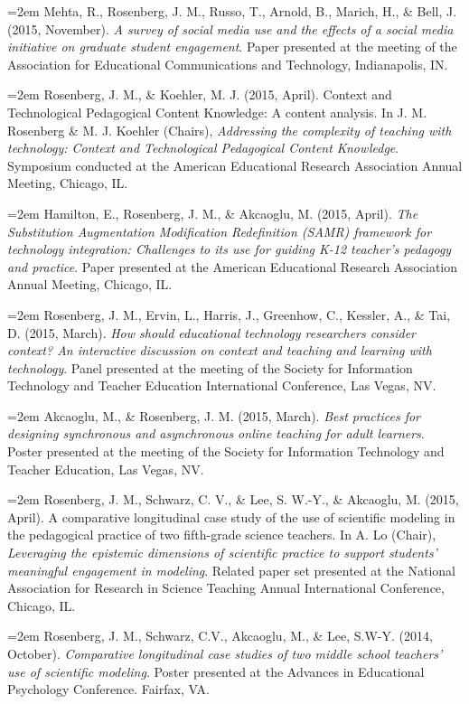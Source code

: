 \documentclass[
  14,
]{article}
\begin{document}
\hangindent=2em Mehta, R., Rosenberg, J. M., Russo, T., Arnold, B.,
Marich, H., \& Bell, J. (2015, November). \emph{A survey of social media
use and the effects of a social media initiative on graduate student
engagement}. Paper presented at the meeting of the Association for
Educational Communications and Technology, Indianapolis, IN.

\hangindent=2em Rosenberg, J. M., \& Koehler, M. J. (2015, April).
Context and Technological Pedagogical Content Knowledge: A content
analysis. In J. M. Rosenberg \& M. J. Koehler (Chairs), \emph{Addressing
the complexity of teaching with technology: Context and Technological
Pedagogical Content Knowledge}. Symposium conducted at the American
Educational Research Association Annual Meeting, Chicago, IL.

\hangindent=2em Hamilton, E., Rosenberg, J. M., \& Akcaoglu, M. (2015,
April). \emph{The Substitution Augmentation Modification Redefinition
(SAMR) framework for technology integration: Challenges to its use for
guiding K-12 teacher's pedagogy and practice}. Paper presented at the
American Educational Research Association Annual Meeting, Chicago, IL.

\hangindent=2em Rosenberg, J. M., Ervin, L., Harris, J., Greenhow, C.,
Kessler, A., \& Tai, D. (2015, March). \emph{How should educational
technology researchers consider context? An interactive discussion on
context and teaching and learning with technology}. Panel presented at
the meeting of the Society for Information Technology and Teacher
Education International Conference, Las Vegas, NV.

\hangindent=2em Akcaoglu, M., \& Rosenberg, J. M. (2015, March).
\emph{Best practices for designing synchronous and asynchronous online
teaching for adult learners}. Poster presented at the meeting of the
Society for Information Technology and Teacher Education, Las Vegas, NV.

\hangindent=2em Rosenberg, J. M., Schwarz, C. V., \& Lee, S. W.-Y., \&
Akcaoglu, M. (2015, April). A comparative longitudinal case study of the
use of scientific modeling in the pedagogical practice of two
fifth-grade science teachers. In A. Lo (Chair), \emph{Leveraging the
epistemic dimensions of scientific practice to support students'
meaningful engagement in modeling}. Related paper set presented at the
National Association for Research in Science Teaching Annual
International Conference, Chicago, IL.

\hangindent=2em Rosenberg, J. M., Schwarz, C.V., Akcaoglu, M., \& Lee,
S.W-Y. (2014, October). \emph{Comparative longitudinal case studies of
two middle school teachers' use of scientific modeling}. Poster
presented at the Advances in Educational Psychology Conference. Fairfax,
VA.
\end{document}
